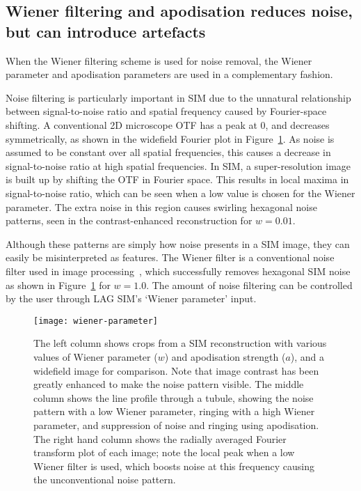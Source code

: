 \newpage
\subsection{Wiener filtering and apodisation reduces noise, but can introduce artefacts}\label{sec:wiener-recon}
When the Wiener filtering scheme is used for noise removal, the Wiener parameter and apodisation parameters are used in a complementary fashion.

Noise filtering is particularly important in SIM due to the unnatural relationship between signal-to-noise ratio and spatial frequency caused by Fourier-space shifting.
A conventional 2D microscope OTF has a peak at 0, and decreases symmetrically, as shown in the widefield Fourier plot in Figure~\ref{fig:wiener-parameter}.
As noise is assumed to be constant over all spatial frequencies, this causes a decrease in signal-to-noise ratio at high spatial frequencies.
In SIM, a super-resolution image is built up by shifting the OTF in Fourier space.
This results in local maxima in signal-to-noise ratio, which can be seen when a low value is chosen for the Wiener parameter.
The extra noise in this region causes swirling hexagonal noise patterns, seen in the contrast-enhanced reconstruction for $w=0.01$.

Although these patterns are simply how noise presents in a SIM image, they can easily be misinterpreted as features.
The Wiener filter is a conventional noise filter used in image processing~\cite[\textit{ch. 4}]{brown2012introduction}, which successfully removes hexagonal SIM noise as shown in Figure~\ref{fig:wiener-parameter} for $w=1.0$.
The amount of noise filtering can be controlled by the user through LAG SIM's `Wiener parameter' input.


\begin{figure}[p]
\centering
\texttt{[image: wiener-parameter]}
\caption[LAG SIM: The Wiener parameter and apodisation strength must be chosen to minimise artefacts]{The left column shows crops from a SIM reconstruction with various values of Wiener parameter ($w$) and apodisation strength ($a$), and a widefield image for comparison. Note that image contrast has been greatly enhanced to make the noise pattern visible. The middle column shows the line profile through a tubule, showing the noise pattern with a low Wiener parameter, ringing with a high Wiener parameter, and suppression of noise and ringing using apodisation. The right hand column shows the radially averaged Fourier transform plot of each image; note the local peak when a low Wiener filter is used, which boosts noise at this frequency causing the unconventional noise pattern.}
\label{fig:wiener-parameter}
\end{figure}

